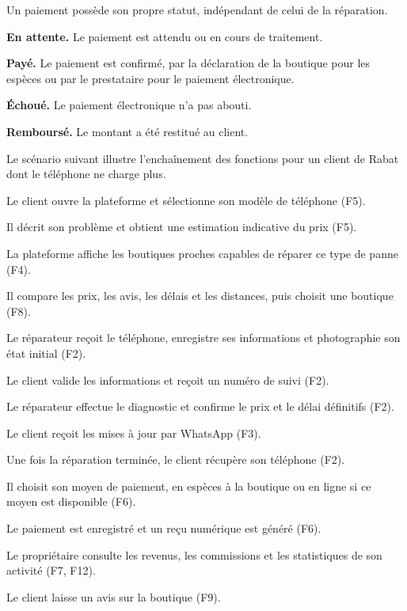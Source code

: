
Un paiement possède son propre statut, indépendant de celui de la réparation.

\begin{cdcitems}
  \item \textbf{En attente.} Le paiement est attendu ou en cours de traitement.
  \item \textbf{Payé.} Le paiement est confirmé, par la déclaration de la boutique pour les espèces ou par le prestataire pour le paiement électronique.
  \item \textbf{Échoué.} Le paiement électronique n’a pas abouti.
  \item \textbf{Remboursé.} Le montant a été restitué au client.
\end{cdcitems}


Le scénario suivant illustre l’enchaînement des fonctions pour un client de Rabat dont le téléphone ne charge plus.

\begin{cdcetapes}
  \item Le client ouvre la plateforme et sélectionne son modèle de téléphone (F5).
  \item Il décrit son problème et obtient une estimation indicative du prix (F5).
  \item La plateforme affiche les boutiques proches capables de réparer ce type de panne (F4).
  \item Il compare les prix, les avis, les délais et les distances, puis choisit une boutique (F8).
  \item Le réparateur reçoit le téléphone, enregistre ses informations et photographie son état initial (F2).
  \item Le client valide les informations et reçoit un numéro de suivi (F2).
  \item Le réparateur effectue le diagnostic et confirme le prix et le délai définitifs (F2).
  \item Le client reçoit les mises à jour par WhatsApp (F3).
  \item Une fois la réparation terminée, le client récupère son téléphone (F2).
  \item Il choisit son moyen de paiement, en espèces à la boutique ou en ligne si ce moyen est disponible (F6).
  \item Le paiement est enregistré et un reçu numérique est généré (F6).
  \item Le propriétaire consulte les revenus, les commissions et les statistiques de son activité (F7, F12).
  \item Le client laisse un avis sur la boutique (F9).
\end{cdcetapes}


